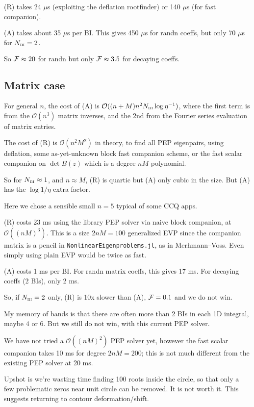 \documentclass[11pt]{article}
\newcommand{\tbox}[1]{{\mbox{\tiny #1}}}
\newcommand{\bigO}{{\mathcal O}}
\begin{document}
(R) takes 24 $\mu$s (exploiting the deflation rootfinder)
or 140 $\mu$s (for fast companion).

(A) takes about 35 $\mu$s per BI. This gives
450 $\mu$s for randn coeffs, but only 70 $\mu$s for $N_\tbox{BI}=2$.

So ${\cal F} \approx 20$ for randn
but only ${\cal F} \approx 3.5$ for decaying coeffs.

\subsection{Matrix case}

For general $n$,
the cost of (A) is $\bigO((n+M)n^2 N_\tbox{BI} \log \eta^{-1})$,
where the first term is from the $\bigO(n^3)$ matrix inverses,
and the 2nd from the Fourier series evaluation of matrix entries.

The cost of (R) is $\bigO(n^2M^2)$ in theory, to find
all PEP eigenpairs, using deflation, some as-yet-unknown
block fast companion scheme, or the fast scalar companion on
$\det B(z)$ which is a degree $nM$ polynomial.

So for $N_\tbox{BI}\approx 1$, and $n\approx M$,
(R) is quartic but (A) only cubic in the size.
But (A) has the $\log 1/\eta$ extra factor.

Here we chose a sensible small $n=5$ typical of some CCQ apps.

(R) costs 23 ms using the library PEP solver via naive block companion,
at $\bigO((nM)^3)$.
This is a size $2nM=100$ generalized EVP since the companion matrix is
a pencil in {\tt NonlinearEigenproblems.jl}, as in Merhmann--Voss.
Even simply using plain EVP would be twice as fast.

(A) costs 1 ms per BI.
For randn matrix coeffs, this gives 17 ms.
For decaying coeffs (2 BIs), only 2 ms.

So, if $N_\tbox{BI}=2$ only, (R) is 10x slower than (A),
${\cal F} = 0.1$ and we do not win.

My memory of bands is that there are often more than 2 BIs in each
1D integral, maybe 4 or 6. But we still do not win, with this current
PEP solver.

We have not tried a $\bigO((nM)^2)$ PEP solver yet,
however the fast scalar companion takes 10 ms for degree $2nM=200$;
this is not much different from the existing PEP solver at 20 ms.

Upshot is we're wasting time finding 100 roots inside the circle,
so that only a few problematic zeros near unit circle can be removed.
It is not worth it. This suggests returning to contour deformation/shift.
\end{document}
